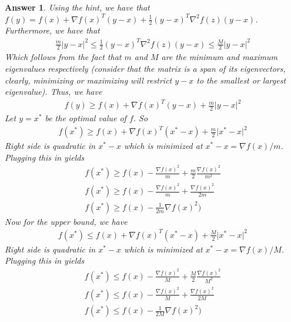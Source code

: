 \documentclass[12pt]{article}
\theoremstyle{colon}
\newtheorem*{answer}{Answer}
\begin{document}
\begin{answer}
  Using the hint, we have that $f(y) = f(x) + \nabla f(x)^T (y - x) + \frac{1}{2}(y - x)^T \nabla^2 f(z) (y - x)$. Furthermore, we have that
  \begin{gather*}
    \frac{m}{2} \lvert y - x \rvert^2 \leq \frac{1}{2}(y - x)^T \nabla^2 f(z) (y - x) \leq \frac{M}{2} \lvert y - x \rvert^2
  \end{gather*}
  Which follows from the fact that $m$ and $M$ are the minimum and maximum eigenvalues respectively (consider that the matrix is a span of its eigenvectors, clearly, minimizing or maximizing will restrict $y-x$ to the smallest or largest eigenvalue). Thus, we have
  \begin{gather*}
    f(y) \geq f(x) + \nabla f(x)^T (y - x) + \frac{m}{2} \lvert y - x \rvert^2
  \end{gather*}
  Let $y = x^*$ be the optimal value of $f$. So
  \begin{gather*}
    f(x^*) \geq f(x) + \nabla f(x)^T (x^* - x) + \frac{m}{2} \lvert x^* - x \rvert^2
  \end{gather*}
  Right side is quadratic in $x^* - x$ which is minimized at $x^* - x = \nabla f(x)/m$. Plugging this in yields
  \begin{gather*}
    f(x^*) \geq f(x) - \frac{\nabla f(x)^2}{m} + \frac{m}{2} \frac{\nabla f(x)^2}{m^2} \\
    f(x^*) \geq f(x) - \frac{\nabla f(x)^2}{m} + \frac{\nabla f(x)^2}{2m} \\
    f(x^*) \geq f(x) - \frac{1}{2m} \nabla f(x)^2)
  \end{gather*}
  Now for the upper bound, we have
  \begin{gather*}
    f(x^*) \leq f(x) + \nabla f(x)^T (x^* - x) + \frac{M}{2} \lvert x^* - x \rvert^2
  \end{gather*}
  Right side is quadratic in $x^* - x$ which is minimized at $x^* - x = \nabla f(x)/M$. Plugging this in yields
  \begin{gather*}
    f(x^*) \leq f(x) - \frac{\nabla f(x)^2}{M} + \frac{M}{2} \frac{\nabla f(x)^2}{M^2} \\
    f(x^*) \leq f(x) - \frac{\nabla f(x)^2}{M} + \frac{\nabla f(x)^2}{2M} \\
    f(x^*) \leq f(x) - \frac{1}{2M} \nabla f(x)^2)
  \end{gather*}
\end{answer}

\clearpage
\end{document}
